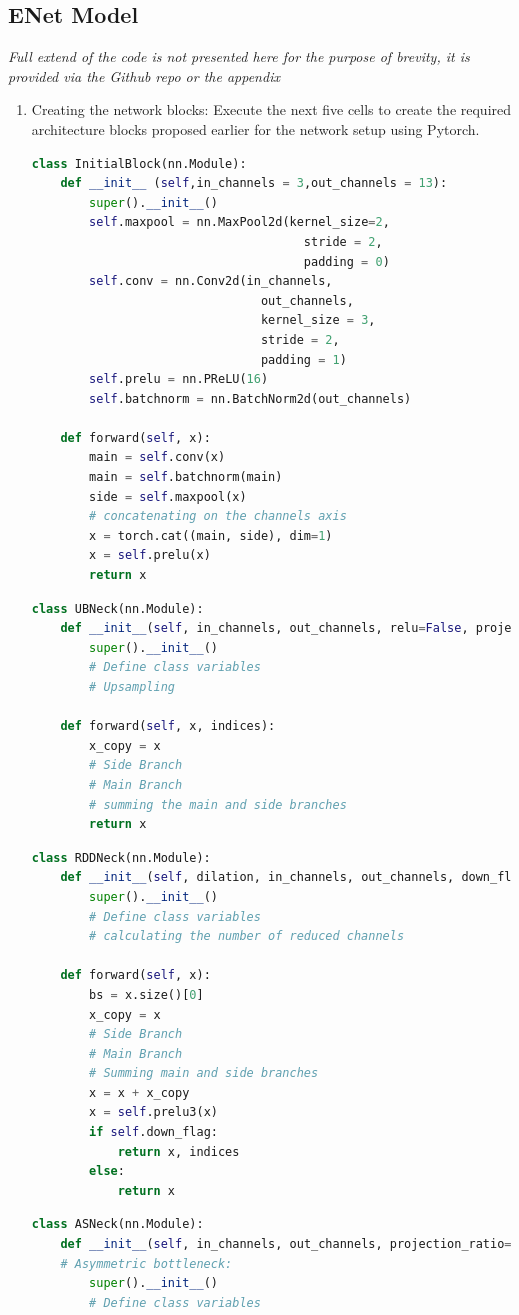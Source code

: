 \subsection*{ENet Model}
\textit{Full extend of the code is not presented here for the purpose of brevity, it is provided via the Github repo or the appendix}
\begin{enumerate}
	\item Creating the network blocks: Execute the next five cells to create the required architecture blocks proposed earlier for the network setup using Pytorch.
	      \begin{lstlisting}[language=Python]
class InitialBlock(nn.Module):
    def __init__ (self,in_channels = 3,out_channels = 13):
        super().__init__()
        self.maxpool = nn.MaxPool2d(kernel_size=2,
                                      stride = 2,
                                      padding = 0)
        self.conv = nn.Conv2d(in_channels,
                                out_channels,
                                kernel_size = 3,
                                stride = 2,
                                padding = 1)
        self.prelu = nn.PReLU(16)
        self.batchnorm = nn.BatchNorm2d(out_channels)
        
    def forward(self, x):
        main = self.conv(x)
        main = self.batchnorm(main)
        side = self.maxpool(x)
        # concatenating on the channels axis
        x = torch.cat((main, side), dim=1)
        x = self.prelu(x)
        return x
        \end{lstlisting}
	      \begin{lstlisting}[language=Python]
class UBNeck(nn.Module):
    def __init__(self, in_channels, out_channels, relu=False, projection_ratio=4):
        super().__init__()
        # Define class variables
        # Upsampling

    def forward(self, x, indices):
        x_copy = x
        # Side Branch
        # Main Branch
        # summing the main and side branches
        return x
        \end{lstlisting}
	      \begin{lstlisting}[language=Python]
class RDDNeck(nn.Module):
    def __init__(self, dilation, in_channels, out_channels, down_flag, relu=False, projection_ratio=4, p=0.1):
        super().__init__()
        # Define class variables
        # calculating the number of reduced channels

    def forward(self, x):
        bs = x.size()[0]
        x_copy = x
        # Side Branch
        # Main Branch
        # Summing main and side branches
        x = x + x_copy
        x = self.prelu3(x)
        if self.down_flag:
            return x, indices
        else:
            return x
        \end{lstlisting}
	      \begin{lstlisting}[language=Python]
class ASNeck(nn.Module):
    def __init__(self, in_channels, out_channels, projection_ratio=4):
    # Asymmetric bottleneck:
        super().__init__()
        # Define class variables


\end{lstlisting}
\end{enumerate}
